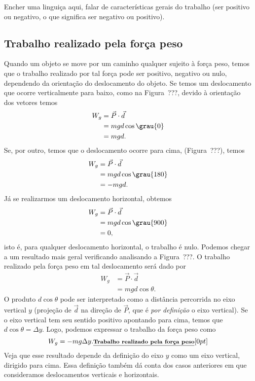 Encher uma linguiça aqui, falar de características gerais do trabalho (ser positivo ou negativo, o que significa ser negativo ou positivo).

\subsection{Trabalho realizado pela força peso}

Quando um objeto se move por um caminho qualquer sujeito à força peso, temos que o trabalho realizado por tal força pode ser positivo, negativo ou nulo, dependendo da orientação do deslocamento do objeto. Se temos um deslocamento que ocorre verticalmente para baixo, como na Figura~???, devido à orientação dos vetores temos
\begin{align}
  W_g &= \vec{P}\cdot\vec{d} \\
  &= mgd\cos\grau{0} \\
  &= mgd.
\end{align}
%
Se, por outro, temos que o deslocamento ocorre para cima, (Figura~???), temos
\begin{align}
  W_g &= \vec{P}\cdot\vec{d} \\
  &= mgd\cos\grau{180} \\
  &= -mgd.
\end{align}
%
Já se realizarmos um deslocamento horizontal, obtemos
\begin{align}
  W_g &= \vec{P}\cdot\vec{d} \\
  &= mgd\cos\grau{900} \\
  &= 0,
\end{align}
%
isto é, para qualquer deslocamento horizontal, o trabalho é nulo. Podemos chegar a um resultado mais geral verificando analisando a Figura~???. 
O trabalho realizado pela força peso em tal deslocamento será dado por
\begin{align}
  W_g &= \vec{P}\cdot\vec{d} \\
  &= mgd\cos\theta.
\end{align}
%
O produto $d\cos\theta$ pode ser interpretado como a distância percorrida no eixo vertical $y$ (projeção de $\vec{d}$ na direção de $\vec{P}$, que é \emph{por definição} o eixo vertical). Se o eixo vertical tem seu sentido positivo apontando para cima, temos que $d\cos\theta = \Delta y$. Logo, podemos expressar o trabalho da força peso como
\begin{equation}\label{Eq:TrabalhoPeso}
  W_g = - mg\Delta y. \relax{\footnotesize\emph{\textbf{Trabalho realizado pela força peso}}}[0pt]
\end{equation}
%
Veja que esse resultado depende da definição do eixo $y$ como um eixo vertical, dirigido para cima. Essa definição também dá conta dos casos anteriores em que consideramos deslocamentos verticais e horizontais.
  
